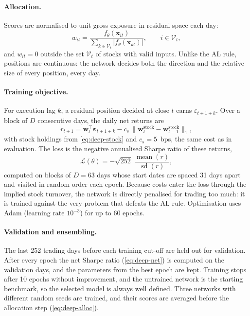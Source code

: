 \paragraph{Allocation.}
Scores are normalised to unit gross exposure in residual space each day:
\begin{equation}
  w_{it} = \frac{f_\theta(\bm x_{it})}{\sum_{k \in \mathcal V_t} |f_\theta(\bm x_{kt})|},
  \qquad i \in \mathcal V_t ,
  \label{eq:deep-alloc}
\end{equation}
and $w_{it} = 0$ outside the set $\mathcal V_t$ of stocks with valid inputs. Unlike the AL rule,
positions are continuous: the network decides both the direction and the relative size of every
position, every day.

\paragraph{Training objective.}
For execution lag $k$, a residual position decided at close $t$ earns $\varepsilon_{t+1+k}$. Over
a block of $D$ consecutive days, the daily net returns are
\begin{equation}
  r_{t+1} = \bm w_t^\top \bm\varepsilon_{t+1+k} - c_s\,\bigl\|\bm w^{\text{stock}}_t - \bm w^{\text{stock}}_{t-1}\bigr\|_1 ,
  \label{eq:deep-net}
\end{equation}
with stock holdings from \cref{eq:deep-stock} and $c_s = 5$~bps, the same cost as in evaluation.
The loss is the negative annualised Sharpe ratio of these returns,
\begin{equation}
  \mathcal L(\theta) = -\sqrt{252}\;\frac{\operatorname{mean}(r)}{\operatorname{sd}(r)} ,
  \label{eq:deep-loss}
\end{equation}
computed on blocks of $D = 63$ days whose start dates are spaced 31 days apart and visited in random
order each epoch. Because costs enter the loss through the implied stock turnover, the network is
directly penalised for trading too much: it is trained against the very problem that defeats the
AL rule. Optimisation uses Adam (learning rate $10^{-3}$) for up to 60 epochs.

\paragraph{Validation and ensembling.}
The last 252 trading days before each training cut-off are held out for validation. After every
epoch the net Sharpe ratio (\cref{eq:deep-net}) is computed on the validation days, and the
parameters from the best epoch are kept. Training stops after 10 epochs without improvement, and
the untrained network is the starting benchmark, so the selected model is always well defined.
Three networks with different random seeds are trained, and their scores are averaged before
the allocation step (\cref{eq:deep-alloc}).

